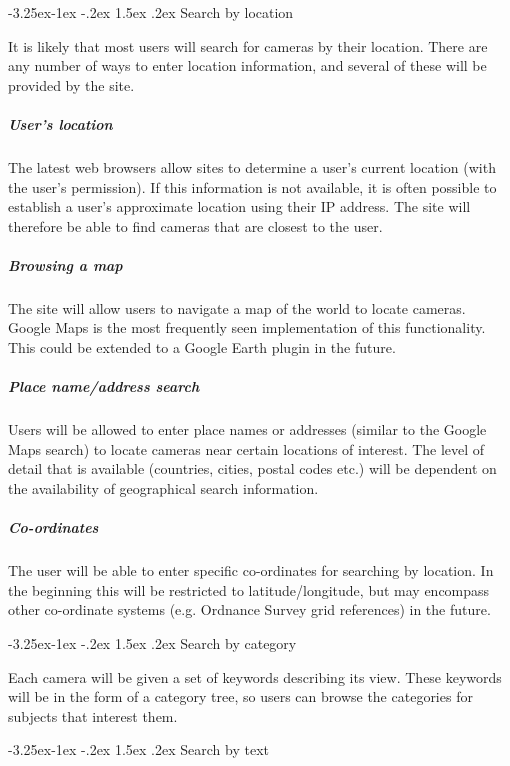 \documentclass[11pt,a4paper]{article}
\makeatletter
\renewcommand\paragraph{\@startsection{paragraph}{4}{\z@}%
  {-3.25ex\@plus -1ex \@minus -.2ex}%
  {1.5ex \@plus .2ex}%
  {\normalfont\normalsize\bfseries}}
\makeatother
\begin{document}
\paragraph{Search by location}

It is likely that most users will search for cameras by their location. There are any number of ways to enter location information, and several of these will be provided by the site.

\subparagraph{User's location}

The latest web browsers allow sites to determine a user's current location (with the user's permission). If this information is not available, it is often possible to establish a user's approximate location using their IP address. The site will therefore be able to find cameras that are closest to the user.

\subparagraph{Browsing a map}

The site will allow users to navigate a map of the world to locate cameras. Google Maps is the most frequently seen implementation of this functionality. This could be extended to a Google Earth plugin in the future.

\subparagraph{Place name/address search}

Users will be allowed to enter place names or addresses (similar to the Google Maps search) to locate cameras near certain locations of interest. The level of detail that is available (countries, cities, postal codes etc.) will be dependent on the availability of geographical search information.

\subparagraph{Co-ordinates}

The user will be able to enter specific co-ordinates for searching by location. In the beginning this will be restricted to latitude/longitude, but may encompass other co-ordinate systems (e.g. Ordnance Survey grid references) in the future.

\paragraph{Search by category}

Each camera will be given a set of keywords describing its view. These keywords will be in the form of a category tree, so users can browse the categories for subjects that interest them.

\paragraph{Search by text}
\end{document}
